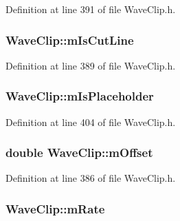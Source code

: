 Definition at line 391 of file Wave\+Clip.\+h.

\subsubsection[{\texorpdfstring{m\+Is\+Cut\+Line}{mIsCutLine}}]{ Wave\+Clip\+::m\+Is\+Cut\+Line\hspace{0.3cm}{\ttfamily [protected]}}\hypertarget{class_wave_clip_a8a0aade8437f6e7400f85b85da659ae5}{}\label{class_wave_clip_a8a0aade8437f6e7400f85b85da659ae5}


Definition at line 389 of file Wave\+Clip.\+h.

\subsubsection[{\texorpdfstring{m\+Is\+Placeholder}{mIsPlaceholder}}]{ Wave\+Clip\+::m\+Is\+Placeholder\hspace{0.3cm}{\ttfamily [protected]}}\hypertarget{class_wave_clip_a22bbde01e18a2d12cc0b3cb28c2c4b40}{}\label{class_wave_clip_a22bbde01e18a2d12cc0b3cb28c2c4b40}


Definition at line 404 of file Wave\+Clip.\+h.

\subsubsection[{\texorpdfstring{m\+Offset}{mOffset}}]{\setlength{\rightskip}{0pt plus 5cm}double Wave\+Clip\+::m\+Offset\hspace{0.3cm}{\ttfamily [protected]}}\hypertarget{class_wave_clip_ab050845a8220c996af5e8b298e8b2b68}{}\label{class_wave_clip_ab050845a8220c996af5e8b298e8b2b68}


Definition at line 386 of file Wave\+Clip.\+h.

\subsubsection[{\texorpdfstring{m\+Rate}{mRate}}]{ Wave\+Clip\+::m\+Rate\hspace{0.3cm}{\ttfamily [protected]}}\hypertarget{class_wave_clip_a4862030d149b9990fb10891c79953f9e}{}\label{class_wave_clip_a4862030d149b9990fb10891c79953f9e}


